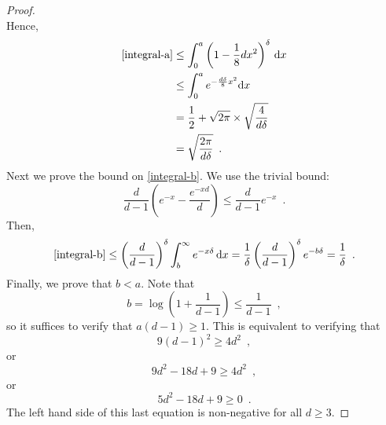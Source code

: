 \documentclass[lotsofwhite]{patmorin}
\begin{document}
\begin{proof}
\[   \]
   Hence,
   \begin{align*}
      \eqref{integral-a} 
        & \le \int_0^a\left(1-\frac{1}{8}dx^2\right)^\delta \, \mathrm{d}x \\
        & \le \int_0^a e^{-\frac{d\delta}{8}x^2} \mathrm{d}x \\
        & = \frac{1}{2}+\sqrt{2\pi}\times\sqrt{\frac{4}{d\delta}} \\
        & = \sqrt{\frac{2\pi}{d\delta}} \enspace .
   \end{align*}
   Next we prove the bound on \eqref{integral-b}.  We use the trivial bound:
   \[
       \frac{d}{d-1}\left(e^{-x}-\frac{e^{-xd}}{d}\right) 
         \le \frac{d}{d-1}e^{-x}
       \enspace .
   \]
   Then,
   \[
      \eqref{integral-b} \le \left(\frac{d}{d-1}\right)^\delta
       \int_b^\infty e^{-x\delta} \,\mathrm{d}x 
       = \frac{1}{\delta}\left(\frac{d}{d-1}\right)^\delta e^{-b\delta}
       = \frac{1}{\delta} \enspace .
   \]
   Finally, we prove that $b<a$.  Note that 
   \[  b=\log\left(1+\frac{1}{d-1}\right)  \le \frac{1}{d-1} \enspace , \]
   so it suffices to verify that $a(d-1)\ge 1$.  This is equivalent to verifying
   that
   \[ 9(d-1)^2 \ge 4d^2 \enspace , \]
   or
   \[ 9d^2 - 18d + 9 \ge 4d^2 \enspace , \]
   or
   \[ 5d^2 - 18d + 9 \ge 0 \enspace . \]
   The left hand side of this last equation is non-negative for all $d\ge 3$.
\end{proof}
\end{document}
